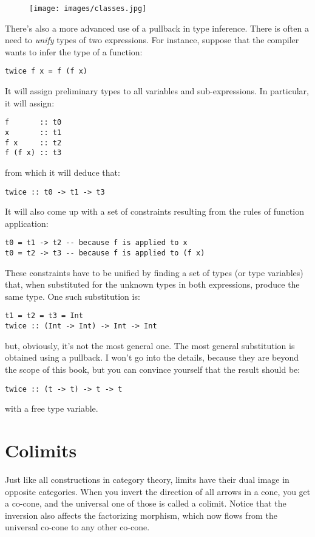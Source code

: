 \begin{figure}[H]
\centering
\texttt{[image: images/classes.jpg]}
\end{figure}

\noindent
There's also a more advanced use of a pullback in type inference. There
is often a need to \emph{unify} types of two expressions. For instance,
suppose that the compiler wants to infer the type of a function:

\begin{Verbatim}
twice f x = f (f x)
\end{Verbatim}
It will assign preliminary types to all variables and sub-expressions.
In particular, it will assign:

\begin{Verbatim}
f       :: t0
x       :: t1
f x     :: t2
f (f x) :: t3
\end{Verbatim}
from which it will deduce that:

\begin{Verbatim}
twice :: t0 -> t1 -> t3
\end{Verbatim}
It will also come up with a set of constraints resulting from the rules
of function application:

\begin{Verbatim}
t0 = t1 -> t2 -- because f is applied to x 
t0 = t2 -> t3 -- because f is applied to (f x)
\end{Verbatim}
These constraints have to be unified by finding a set of types (or type
variables) that, when substituted for the unknown types in both
expressions, produce the same type. One such substitution is:

\begin{Verbatim}
t1 = t2 = t3 = Int 
twice :: (Int -> Int) -> Int -> Int
\end{Verbatim}
but, obviously, it's not the most general one. The most general
substitution is obtained using a pullback. I won't go into the details,
because they are beyond the scope of this book, but you can convince
yourself that the result should be:

\begin{Verbatim}
twice :: (t -> t) -> t -> t
\end{Verbatim}
with  a free type variable.

\section{Colimits}

Just like all constructions in category theory, limits have their dual
image in opposite categories. When you invert the direction of all
arrows in a cone, you get a co-cone, and the universal one of those is
called a colimit. Notice that the inversion also affects the factorizing
morphism, which now flows from the universal co-cone to any other
co-cone.

